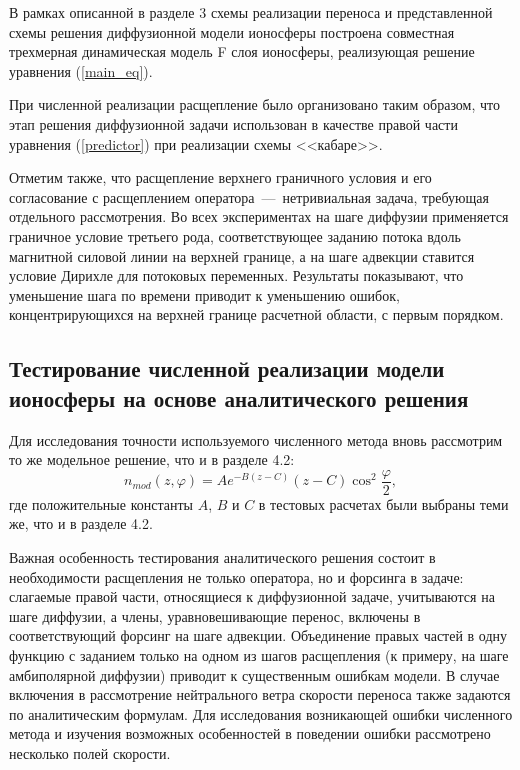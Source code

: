 \documentclass[14pt, a4paper]{extarticle}
\begin{document}
В рамках описанной в разделе 3 схемы реализации переноса и представленной схемы решения диффузионной модели ионосферы построена совместная трехмерная динамическая модель F слоя ионосферы, реализующая решение уравнения (\ref{main_eq}).

При численной реализации расщепление было организовано таким образом, что этап решения диффузионной задачи использован в качестве правой части уравнения (\ref{predictor}) при реализации схемы <<кабаре>>.

Отметим также, что расщепление верхнего граничного условия и его согласование с расщеплением оператора~---~нетривиальная задача, требующая отдельного рассмотрения. Во всех экспериментах на шаге диффузии применяется граничное условие третьего рода, соответствующее заданию потока вдоль магнитной силовой линии на верхней границе, а на шаге адвекции ставится условие Дирихле для потоковых переменных. Результаты показывают, что уменьшение шага по времени приводит к уменьшению ошибок, концентрирующихся на верхней границе расчетной области, с первым порядком.

\subsection{Тестирование численной реализации модели ионосферы на основе аналитического решения}

Для исследования точности используемого численного метода вновь рассмотрим то же модельное решение, что и в разделе 4.2:
\begin{equation}
n_{mod}(z, \varphi) = Ae^{-B(z-C)}(z-C)\cos^2\dfrac{\varphi}{2},
\end{equation}
где положительные константы $A$, $B$ и $C$ в тестовых расчетах были выбраны теми же, что и в разделе 4.2. 

Важная особенность тестирования аналитического решения состоит в необходимости расщепления не только оператора, но и форсинга в задаче: слагаемые правой части, относящиеся к диффузионной задаче, учитываются на шаге диффузии, а члены, уравновешивающие перенос, включены в соответствующий форсинг на шаге адвекции. Объединение правых частей в одну функцию с заданием только на одном из шагов расщепления (к примеру, на шаге амбиполярной диффузии) приводит к существенным ошибкам модели. В случае включения в рассмотрение нейтрального ветра скорости переноса также задаются по аналитическим формулам. Для исследования возникающей ошибки численного метода и изучения возможных особенностей в поведении ошибки рассмотрено несколько полей скорости. 
\end{document}
